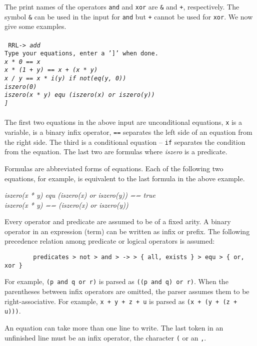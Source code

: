 The print names of the operators {\tt and} and {\tt xor} are {\tt \&}
and {\tt +}, respectively. The symbol {\tt \&}
can be used in the input for {\tt and} but {\tt +}
cannot be used for {\tt xor}. We now give some
examples. \\ \\
{\tt 
RRL-> {\em add} \\
Type your equations, enter a ']' when done.\\
\em x * 0 == x\\
x * (1 + y) == x + (x * y)\\
x / y == x * i(y) if not(eq(y, 0))\\
iszero(0)\\
iszero(x * y) equ (iszero(x) or iszero(y))\\
]} \\ \\
The first two equations in the above input are unconditional
equations, {\tt x} is a variable, {\tt *} is a binary infix operator,
{\tt ==} separates the left side of an equation from the
right side.  The third is a conditional equation -- {\tt if}
separates the condition from the equation. The last two are formulas
where {\em iszero} is a predicate.
  
Formulas are abbreviated forms of equations. Each of
the following two
equations, for example, is equivalent to the last formula 
in the above example.
\begin{center}
\em iszero(x * y) equ (iszero(x) or iszero(y)) == true\\
iszero(x * y) == (iszero(x) or iszero(y))
\end{center}
  
Every operator and predicate are assumed to be of a fixed arity.  A
binary operator in an expression (term) can be written as infix or prefix. 
The following precedence relation among predicate or logical operators is 
assumed: 
\begin{verbatim}
        predicates > not > and > -> > { all, exists } > equ > { or, xor }
\end{verbatim}
For example, {\tt (p and q or r)} is parsed as {\tt ((p and q) or r)}.
When the parentheses between infix operators are omitted, the parser
assumes them to be right-associative. For example, {\tt x + y + z + u}
is parsed as {\tt (x + (y + (z + u)))}.
  
An equation can take more than one line to write. The last token in an
unfinished line must be an infix operator, 
the character {\tt (} or an {\tt ,}.
  

